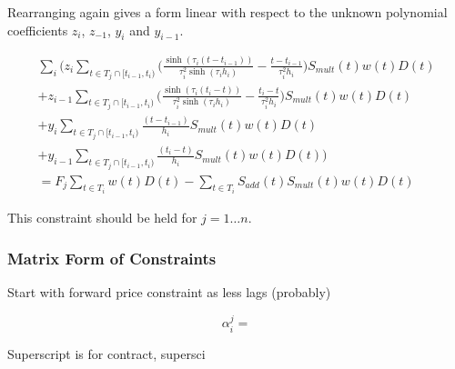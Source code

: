 \documentclass{article}
\begin{document}
Rearranging again gives a form linear with respect to the unknown polynomial coefficients
$z_i$, $z_{-1}$, $y_i$ and $y_{i-1}$.

\begin{multline}
    \sum_i \biggl(  z_i \sum_{t \in T_j \cap [t_{i-1}, t_i)} \biggl( \frac{\sinh(\tau_i (t - t_{i-1}))}{\tau_i^2 \sinh(\tau_i h_i)} 
      - \frac{t - t_{i-1}}{\tau_i^2 h_i} \biggr) S_{mult}(t)w(t)D(t) \\
    + z_{i-1} \sum_{t \in T_j \cap [t_{i-1}, t_i)} \biggl( \frac{\sinh(\tau_i (t_i - t))}{\tau_i^2 \sinh(\tau_i h_i)} 
     - \frac{t_i - t}{\tau_i^2 h_i} \biggr) S_{mult}(t)w(t)D(t) \\
    + y_i \sum_{t \in T_j \cap [t_{i-1}, t_i)} \frac{(t - t_{i-1})}{h_i} S_{mult}(t)w(t)D(t) \\
    + y_{i-1} \sum_{t \in T_j \cap [t_{i-1}, t_i)} \frac{(t_i - t)}{h_i} S_{mult}(t)w(t)D(t) \biggr) \\
    = F_j \sum_{t \in T_i} w(t)D(t) - \sum_{t \in T_i} S_{add}(t) S_{mult}(t)w(t)D(t)
\end{multline}

This constraint should be held for $j=1 \hdots n$.

\subsubsection{Matrix Form of Constraints}


Start with forward price constraint as less lags (probably)

\begin{equation}
    \alpha^j_i = 
\end{equation}

Superscript is for contract, supersci
\end{document}
